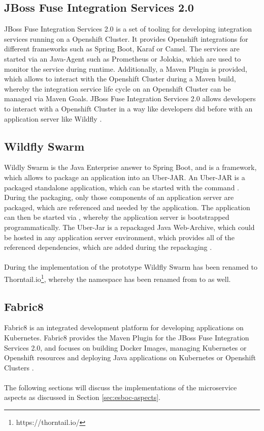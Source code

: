 \subsection{JBoss Fuse Integration Services 2.0}
\label{sec:esbi-technology-fis}
JBoss Fuse Integration Services 2.0 is a set of tooling for developing integration services running on a Openshift Cluster. It provides Openshift integrations for different frameworks such as Spring Boot, Karaf or Camel. The services are started via an Java-Agent such as Prometheus or Jolokia, which are used to monitor the service during runtime. Additionally, a Maven Plugin is provided, which allows to interact with the Openshift Cluster during a Maven build, whereby the integration service life cycle on an Openshift Cluster can be managed via Maven Goals. JBoss Fuse Integration Services 2.0 allows developers to interact with a Openshift Cluster in a way like developers did before with an application server like Wildfly \cite{Prometheus2018, Jolokia2018}.

\subsection{Wildfly Swarm}
\label{sec:esbi-technology-swarm}
Wildly Swarm is the Java Enterprise answer to Spring Boot, and is a framework, which allows to package an application into an Uber-JAR. An Uber-JAR is a packaged standalone application, which can be started with the command . During the packaging, only those components of an application server are packaged, which are referenced and needed by the application. The application can then be started via , whereby the application server is bootstrapped programmatically. The Uber-Jar is a repackaged Java Web-Archive, which could be hosted in any application server environment, which provides all of the referenced dependencies, which are added during the repackaging  \cite{WildflySwarm2018}. 
\\ \\
During the implementation of the prototype Wildfly Swarm has been renamed to Thorntail.io\footnote{https://thorntail.io/}, whereby the namespace has been renamed from  to  as well.

\subsection{Fabric8}
\label{sec:esbi-technology-f8}
Fabric8 is an integrated development platform for developing applications on Kubernetes. Fabric8 provides the Maven Plugin for the JBoss Fuse Integration Services 2.0, and focuses on building Docker Images, managing Kubernetes or Openshift resources and deploying Java applications on Kubernetes or Openshift Clusters \cite{Fabric82018}.
\\ \\
The following sections will discuss the implementations of the microservice aspects as discussed in Section \vref{sec:esboc-aspects}.

